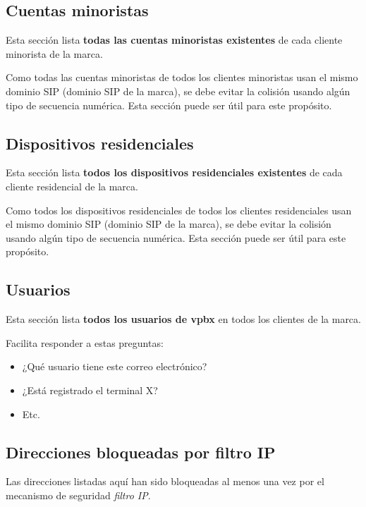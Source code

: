 \documentclass[letterpaper,10pt,spanish]{sphinxmanual}
\begin{document}
\subsection{Cuentas minoristas}
\label{administration_portal/brand/views/retail_accounts::doc}\label{administration_portal/brand/views/retail_accounts:retail-accounts}
Esta sección lista \textbf{todas las cuentas minoristas existentes} de cada cliente minorista de la marca.

Como todas las cuentas minoristas de todos los clientes minoristas usan el mismo dominio SIP (dominio SIP de la marca), se debe evitar la colisión usando algún tipo de secuencia numérica. Esta sección puede ser útil para este propósito.


\subsection{Dispositivos residenciales}
\label{administration_portal/brand/views/residential_devices::doc}\label{administration_portal/brand/views/residential_devices:residential-devices}
Esta sección lista \textbf{todos los dispositivos residenciales existentes} de cada cliente residencial de la marca.

Como todos los dispositivos residenciales de todos los clientes residenciales usan el mismo dominio SIP (dominio SIP de la marca), se debe evitar la colisión usando algún tipo de secuencia numérica. Esta sección puede ser útil para este propósito.


\subsection{Usuarios}
\label{administration_portal/brand/views/users::doc}\label{administration_portal/brand/views/users:users}
Esta sección lista \textbf{todos los usuarios de vpbx} en todos los clientes de la marca.

Facilita responder a estas preguntas:
\begin{itemize}
\item {} 
¿Qué usuario tiene este correo electrónico?

\item {} 
¿Está registrado el terminal X?

\item {} 
Etc.

\end{itemize}


\subsection{Direcciones bloqueadas por filtro IP}
\label{administration_portal/brand/views/ipfilter_blocked_addresses:ip-filter-blocked-addresses}\label{administration_portal/brand/views/ipfilter_blocked_addresses::doc}\label{administration_portal/brand/views/ipfilter_blocked_addresses:id1}
Las direcciones listadas aquí han sido bloqueadas al menos una vez por el mecanismo de seguridad \emph{filtro IP}.
\end{document}
